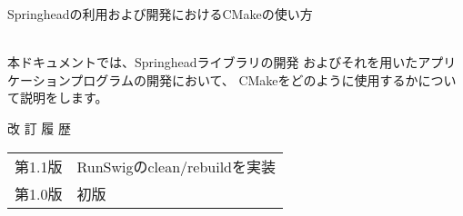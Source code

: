 \documentclass[a4j,12pt]{jsarticle}
\begin{document}


\begin{center}
  \Large{Springheadの利用および開発におけるCMakeの使い方} \\
  {\normalsize} \\
\end{center}

\bigskip
\noindent
本ドキュメントでは、Springheadライブラリの開発
およびそれを用いたアプリケーションプログラムの開発において、
CMakeをどのように使用するかについて説明をします。

\vfill
\begin{center}\small{%
  改 訂 履 歴\\
  \medskip
  \begin{tabular}{ll}
    第1.1版 & RunSwigのclean/rebuildを実装 \\
    第1.0版 & 初版 \\
  \end{tabular}
}\end{center}
\vspace{1.5cm}

\newpage
\setcounter{tocdepth}{3}
\tableofcontents





%





%




\end{document}
